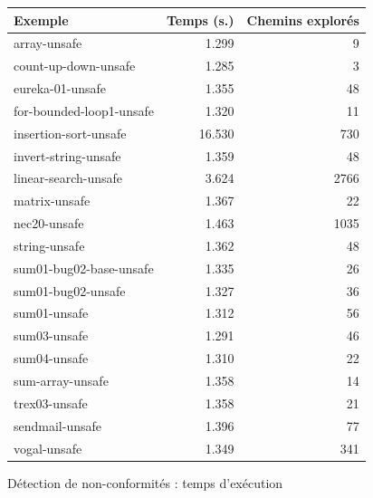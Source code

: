 \begin{figure}[tb]\scriptsize
  \begin{center}
    \begin{tabular}{lrr}
      \hline
      Exemple & Temps (s.) & Chemins explorés \\ \hline
      array-unsafe & 1.299 & 9 \\ \hline
      count-up-down-unsafe & 1.285 & 3 \\ \hline
      eureka-01-unsafe & 1.355 & 48 \\ \hline
      for-bounded-loop1-unsafe & 1.320 & 11 \\ \hline
      insertion-sort-unsafe & 16.530 & 730 \\ \hline
      invert-string-unsafe & 1.359 & 48 \\ \hline
      linear-search-unsafe & 3.624 & 2766 \\ \hline
      matrix-unsafe & 1.367 & 22 \\ \hline
      nec20-unsafe & 1.463 & 1035 \\ \hline
      string-unsafe & 1.362 & 48 \\ \hline
      sum01-bug02-base-unsafe & 1.335 & 26 \\ \hline
      sum01-bug02-unsafe & 1.327 & 36 \\ \hline
      sum01-unsafe & 1.312 & 56 \\ \hline
      sum03-unsafe & 1.291 & 46 \\ \hline
      sum04-unsafe & 1.310 & 22 \\ \hline
      sum-array-unsafe & 1.358 & 14 \\ \hline
      trex03-unsafe & 1.358 & 21 \\ \hline
      sendmail-unsafe & 1.396 & 77 \\ \hline
      vogal-unsafe & 1.349 & 341 \\ \hline
    \end{tabular}
  \end{center}
  \vspace{-3mm}
  \caption{Détection de non-conformités : temps d'exécution}    
  \label{fig:scam-experiments1}
  \vspace{-3mm}
\end{figure}

